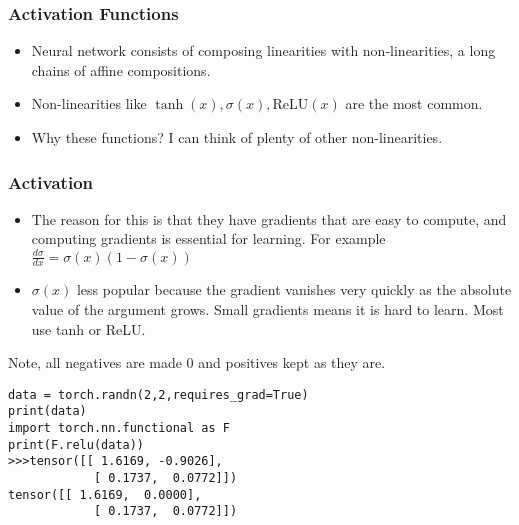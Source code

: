 \begin{frame}[fragile]
\frametitle{Activation Functions}

\begin{itemize}
\item Neural network consists of composing linearities with non-linearities, a long chains of affine compositions.
\item Non-linearities like $\tanh(x), \sigma(x), \text{ReLU}(x)$ are the most common.
\item Why these functions? I can think of plenty of other non-linearities.
\end{itemize}
\end{frame} 

\begin{frame}[fragile]
\frametitle{Activation}

\begin{itemize}
\item The reason for this is that they have gradients that are easy to compute, and computing gradients is essential for learning. For example $ \frac{d\sigma}{dx} = \sigma(x)(1 - \sigma(x)) $
\item $ \sigma(x)$ less popular because the gradient vanishes very quickly as the absolute value of the argument grows. Small gradients means it is hard to learn. Most use tanh or ReLU.
\end{itemize}

 Note, all negatives are made 0 and positives kept as they are.

\begin{lstlisting}
data = torch.randn(2,2,requires_grad=True)
print(data)
import torch.nn.functional as F
print(F.relu(data))
>>>tensor([[ 1.6169, -0.9026],
			[ 0.1737,  0.0772]])
tensor([[ 1.6169,  0.0000],
			[ 0.1737,  0.0772]])
\end{lstlisting}
\end{frame} 

